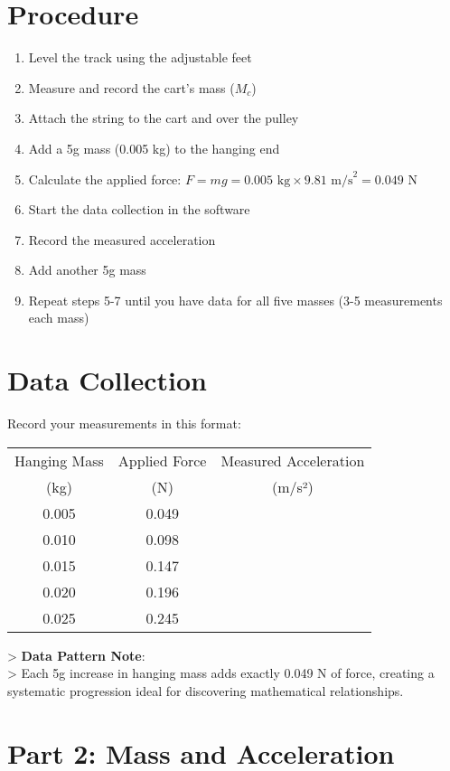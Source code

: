 \documentclass[12pt]{article}
\begin{document}
\section*{Procedure}
\begin{enumerate}[label=\arabic*.]
\item Level the track using the adjustable feet
\item Measure and record the cart's mass ($M_c$)
\item Attach the string to the cart and over the pulley
\item Add a 5g mass (0.005 kg) to the hanging end
\item Calculate the applied force: $F = mg = 0.005\text{ kg} \times 9.81\text{ m/s}^2 = 0.049\text{ N}$
\item Start the data collection in the software
\item Record the measured acceleration
\item Add another 5g mass
\item Repeat steps 5-7 until you have data for all five masses (3-5 measurements each mass)
\end{enumerate}

\section*{Data Collection}
Record your measurements in this format:

\begin{table}[H]
\centering
\begin{tabular}{ccc}
\toprule
Hanging Mass & Applied Force & Measured Acceleration \\
(kg) & (N) & (m/s²) \\
\midrule
0.005 & 0.049 & \\
0.010 & 0.098 & \\
0.015 & 0.147 & \\
0.020 & 0.196 & \\
0.025 & 0.245 & \\
\bottomrule
\end{tabular}
\end{table}

> \textbf{Data Pattern Note}:\\
> Each 5g increase in hanging mass adds exactly 0.049 N of force, creating a systematic progression ideal for discovering mathematical relationships.

\section*{Part 2: Mass and Acceleration}
\end{document}

